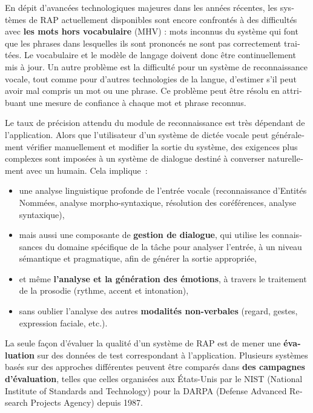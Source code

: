 \begin{french}
\begin{multicols}{2}
En dépit d'avancées technologiques majeures dans les années récentes,
les systèmes de RAP actuellement disponibles sont encore confrontés à
des difficultés avec {\bf les mots hors vocabulaire} (MHV) : mots
inconnus du système qui font que les phrases dans lesquelles ils sont
prononcés ne sont pas correctement traitées. Le vocabulaire et le
modèle de langage doivent donc être continuellement mis à jour. Un
autre problème est la difficulté pour un système de reconnaissance
vocale, tout comme pour d'autres technologies de la langue,
d'estimer s'il peut avoir mal compris un mot ou une phrase. Ce
problème peut être résolu en attribuant une mesure de confiance à
chaque mot et phrase reconnus.

Le taux de précision attendu du module de reconnaissance est très
dépendant de l'application. Alors que l'utilisateur d'un système de
dictée vocale peut généralement vérifier manuellement et modifier la
sortie du système, des exigences plus complexes sont imposées à un
système de dialogue destiné à converser naturellement avec un
humain. Cela implique~: 
\begin{itemize}
\item une analyse linguistique profonde de l'entrée vocale
  (reconnaissance d'Entités Nommées, analyse morpho-syntaxique,
  résolution des coréférences, analyse syntaxique),
\item mais aussi une composante de {\bf gestion de dialogue}, qui
  utilise les connaissances du domaine spécifique de la tâche pour
  analyser l'entrée, à un niveau sémantique et pragmatique, afin de
  générer la sortie appropriée,
\item et même {\bf l'analyse et la génération des émotions}, à
  travers le traitement de la prosodie (rythme, accent et intonation),
\item sans oublier l'analyse des autres {\bf modalités non-verbales}
  (regard, gestes, expression faciale, etc.).
\end{itemize}

La seule façon d'évaluer la qualité d'un système de RAP est de mener
une {\bf évaluation} sur des données de test correspondant à
l'application. Plusieurs systèmes basés sur des approches différentes
peuvent être comparés dans {\bf des campagnes d'évaluation}, telles
que celles organisées aux États-Unis par le NIST (National Institute
of Standards and Technology) pour la DARPA (Defense Advanced Research
Projects Agency) depuis 1987.


\end{multicols}
\end{french}
